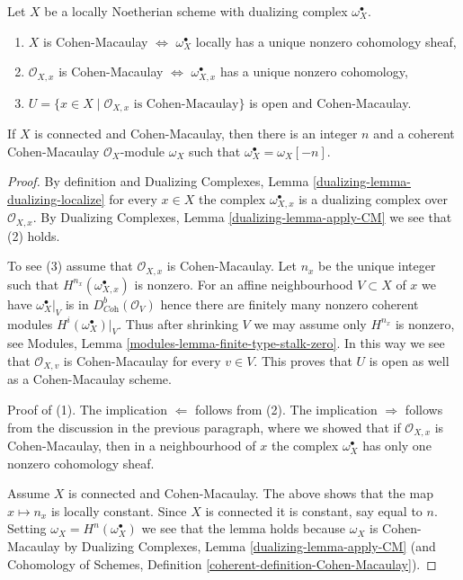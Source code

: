 \begin{lemma}
\label{lemma-dualizing-module-CM-scheme}
Let $X$ be a locally Noetherian scheme with dualizing complex
$\omega_X^\bullet$.
\begin{enumerate}
\item $X$ is Cohen-Macaulay $\Leftrightarrow$ $\omega_X^\bullet$
locally has a unique nonzero cohomology sheaf,
\item $\mathcal{O}_{X, x}$ is Cohen-Macaulay $\Leftrightarrow$
$\omega_{X, x}^\bullet$ has a unique nonzero cohomology,
\item $U = \{x \in X \mid \mathcal{O}_{X, x}\text{ is Cohen-Macaulay}\}$
is open and Cohen-Macaulay.
\end{enumerate}
If $X$ is connected and Cohen-Macaulay, then there is an integer $n$
and a coherent Cohen-Macaulay $\mathcal{O}_X$-module $\omega_X$
such that $\omega_X^\bullet = \omega_X[-n]$.
\end{lemma}

\begin{proof}
By definition and Dualizing Complexes, Lemma
\ref{dualizing-lemma-dualizing-localize} for every $x \in X$
the complex $\omega_{X, x}^\bullet$ is a dualizing complex over
$\mathcal{O}_{X, x}$. By
Dualizing Complexes, Lemma \ref{dualizing-lemma-apply-CM}
we see that (2) holds.

\medskip\noindent
To see (3) assume that $\mathcal{O}_{X, x}$ is Cohen-Macaulay.
Let $n_x$ be the unique integer such that
$H^{n_{x}}(\omega_{X, x}^\bullet)$ is nonzero.
For an affine neighbourhood $V \subset X$
of $x$ we have $\omega_X^\bullet|_V$ is in $D^b_{\textit{Coh}}(\mathcal{O}_V)$
hence there are finitely many nonzero coherent modules
$H^i(\omega_X^\bullet)|_V$. Thus after shrinking $V$ we may assume
only $H^{n_x}$ is nonzero, see
Modules, Lemma \ref{modules-lemma-finite-type-stalk-zero}.
In this way we see that $\mathcal{O}_{X, v}$ is Cohen-Macaulay
for every $v \in V$. This proves that $U$ is open as well
as a Cohen-Macaulay scheme.

\medskip\noindent
Proof of (1). The implication $\Leftarrow$ follows from (2).
The implication $\Rightarrow$ follows from the discussion
in the previous paragraph, where we showed that if $\mathcal{O}_{X, x}$
is Cohen-Macaulay, then in a neighbourhood of $x$ the complex
$\omega_X^\bullet$ has only one nonzero cohomology sheaf.

\medskip\noindent
Assume $X$ is connected and Cohen-Macaulay. The above shows that
the map $x \mapsto n_x$ is locally constant.
Since $X$ is connected it is constant, say equal to $n$.
Setting $\omega_X = H^n(\omega_X^\bullet)$ we see that the lemma
holds because $\omega_X$ is Cohen-Macaulay by
Dualizing Complexes, Lemma \ref{dualizing-lemma-apply-CM}
(and Cohomology of Schemes, Definition
\ref{coherent-definition-Cohen-Macaulay}).
\end{proof}

